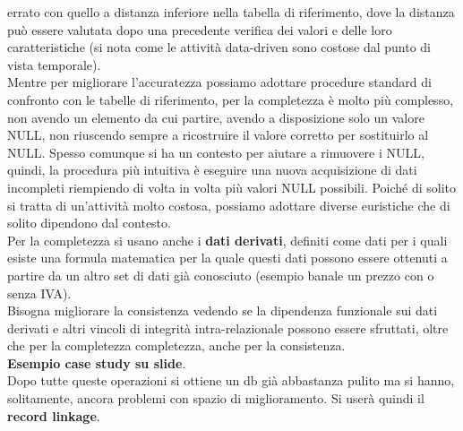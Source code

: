 \documentclass[a4paper,12pt, oneside]{book}
\begin{document}
errato con quello a distanza inferiore nella tabella di riferimento, dove la
distanza può essere valutata dopo una precedente verifica dei valori e delle
loro caratteristiche (si nota come le attività data-driven sono costose dal
punto di vista temporale). \\
Mentre per migliorare l'accuratezza possiamo adottare procedure standard di
confronto con le tabelle di riferimento, per la completezza è molto più
complesso, non avendo un elemento da cui partire, avendo a disposizione solo un
valore NULL, non riuscendo sempre a ricostruire il valore corretto per
sostituirlo al NULL. Spesso comunque si ha un contesto per aiutare a rimuovere i
NULL, quindi, la procedura più intuitiva è eseguire una nuova acquisizione di
dati incompleti riempiendo di volta in volta più valori NULL possibili. Poiché
di solito si tratta di un'attività molto costosa, 
possiamo adottare diverse euristiche che di solito dipendono dal contesto. \\
Per la completezza si usano anche i \textbf{dati derivati}, definiti come dati
per i quali esiste una formula matematica per la quale questi dati possono
essere ottenuti a partire da un altro set di dati già conosciuto (esempio banale
un prezzo con o senza IVA).\\
Bisogna migliorare la consistenza vedendo se la dipendenza funzionale sui dati
derivati e altri vincoli di integrità intra-relazionale possono essere
sfruttati, oltre che per la completezza completezza, anche per la consistenza.\\
\textbf{Esempio case study su slide}.\\
Dopo tutte queste operazioni si ottiene un db già abbastanza pulito ma si hanno,
solitamente, ancora problemi con spazio di miglioramento. Si userà quindi il
\textbf{record linkage}.
\end{document}
